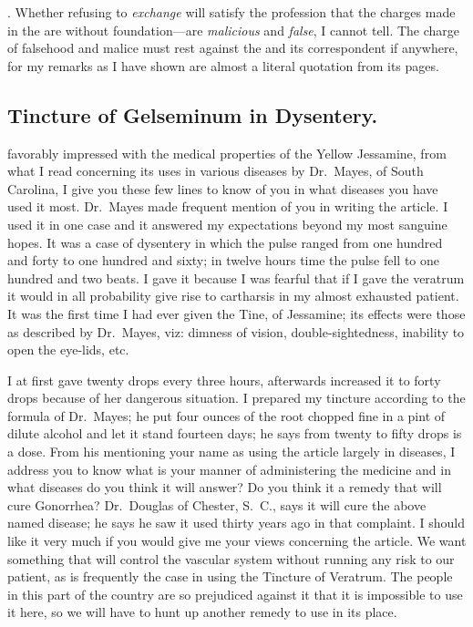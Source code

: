 . Whether refusing to \emph{exchange} will
satisfy the profession that the charges made in the  are without
foundation---are \emph{malicious} and \emph{false}, I cannot tell. The charge of falsehood
and malice must rest against the  and its correspondent
if anywhere, for my remarks as I have shown are almost a literal quotation
from its pages.

\subsection*{Tincture of Gelseminum in Dysentery.}


 favorably impressed with the medical properties of the Yellow
Jessamine, from what I read concerning its uses in various diseases by
Dr.\ Mayes, of South Carolina, I give you these few lines to know of
you in what diseases you have used it most. Dr.\ Mayes made frequent
mention of you in writing the article. I used it in one case and it answered
my expectations beyond my most sanguine hopes. It was a case
of dysentery in which the pulse ranged from one hundred and forty to
one hundred and sixty; in twelve hours time the pulse fell to one hundred
and two beats. I gave it because I was fearful that if I gave the
veratrum it would in all probability give rise to cartharsis in my almost
exhausted patient. It was the first time I had ever given the Tine, of
Jessamine; its effects were those as described by Dr.\ Mayes, viz: dimness
of vision, double-sightedness, inability to open the eye-lids, etc.

I at first gave twenty drops every three hours, afterwards increased it
to forty drops because of her dangerous situation. I prepared my tincture
according to the formula of Dr.\ Mayes; he put four ounces of the
root chopped fine in a pint of dilute alcohol and let it stand fourteen days;
he says from twenty to fifty drops is a dose. From his mentioning your
name as using the article largely in diseases, I address you to know
what is your manner of administering the medicine and in what diseases
do you think it will answer? Do you think it a remedy that will
cure Gonorrhea? Dr.\ Douglas of Chester, S.~C., says it will cure the above
named disease; he says he saw it used thirty years ago in that complaint.
I should like it very much if you would give me your views concerning
the article. We want something that will control the vascular system
without running any risk to our patient, as is frequently the case in
using the Tincture of Veratrum. The people in this part of the country
are so prejudiced against it that it is impossible to use it here, so we will
have to hunt up another remedy to use in its place.\endinput
